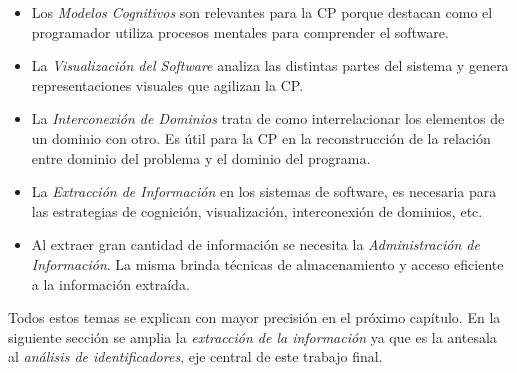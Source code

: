 \begin{itemize}
\itemsep0em%
\item Los \textit{Modelos Cognitivos} son relevantes para la CP porque destacan como el programador utiliza procesos mentales para comprender el software.

\item La \textit{Visualización del Software} analiza las distintas partes del sistema y genera representaciones visuales que agilizan la CP.

\item La \textit{Interconexión de Dominios} trata de como interrelacionar los elementos de un dominio con otro. Es útil para la CP en la reconstrucción de la relación entre dominio del problema y el dominio del programa.

\item La \textit{Extracción de Información} en los sistemas de software, es necesaria para las estrategias de cognición, visualización, interconexión de dominios, etc.

\item Al extraer gran cantidad de información se necesita la \textit{Administración de Información}. La misma brinda técnicas de almacenamiento y acceso eficiente a la información extraída.

\end{itemize}

Todos estos temas se explican con mayor precisión en el próximo capítulo. En la siguiente sección se amplia la \textit{extracción de la información} ya que es la antesala al \textit{análisis de identificadores}, eje central de este trabajo final.






